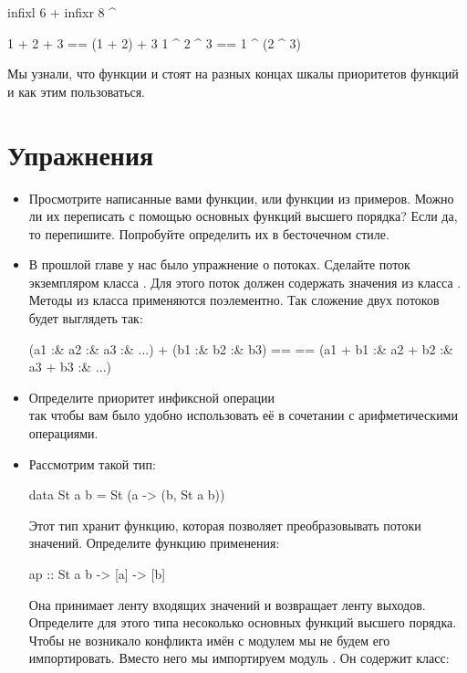 \begin{code}
infixl 6 +
infixr 8 ^

1 + 2 + 3 == (1 + 2) + 3    
1 ^ 2 ^ 3 ==  1 ^ (2 ^ 3)  
\end{code}

Мы узнали, что функции \In{($)} и  стоят на разных концах шкалы
приоритетов функций и как этим пользоваться.

\section{Упражнения}

\begin{itemize}
\item
  Просмотрите написанные вами функции, или функции из примеров. Можно ли
  их переписать с помощью основных функций высшего порядка? Если да, то
  перепишите. Попробуйте определить их в бесточечном стиле.
\item
  В прошлой главе у нас было упражнение о потоках. Сделайте поток
  экземпляром класса . Для этого поток должен содержать значения
  из класса . Методы из класса  применяются поэлементно.
  Так сложение двух потоков будет выглядеть так:


  \begin{code}
  (a1 :& a2 :& a3 :& ...) + (b1 :& b2 :& b3) ==
  ==  (a1 + b1 :& a2 + b2 :& a3 + b3 :& ...)
  \end{code}
\item
  Определите приоритет инфиксной операции \In{(:&)}\\ так чтобы вам было
  удобно использовать её в сочетании с арифметическими операциями.
\item
  Рассмотрим такой тип:


  \begin{code}
  data St a b = St (a -> (b, St a b))
  \end{code}

  Этот тип хранит функцию, которая позволяет преобразовывать потоки
  значений. Определите функцию применения:


  \begin{code}
  ap :: St a b -> [a] -> [b]
  \end{code}

  Она принимает ленту входящих значений и возвращает ленту выходов.
  Определите для этого типа несоколько основных функций высшего порядка.
  Чтобы не возникало конфликта имён с модулем  мы не
  будем его импортировать. Вместо него мы импортируем модуль
  . Он содержит класс:



\end{itemize}
